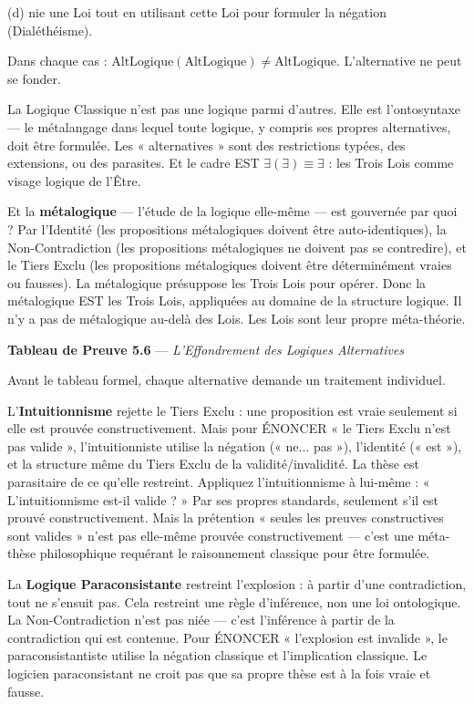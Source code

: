 \documentclass[10pt, openany, oneside]{book}
\begin{document}
(d) nie une Loi tout en utilisant cette Loi pour formuler la négation (Dialéthéisme).

Dans chaque cas : $\text{AltLogique}(\text{AltLogique}) \neq \text{AltLogique}$. L'alternative ne peut se fonder.

La Logique Classique n'est pas une logique parmi d'autres. Elle est l'ontosyntaxe --- le métalangage dans lequel toute logique, y compris ses propres alternatives, doit être formulée. Les « alternatives » sont des restrictions typées, des extensions, ou des parasites. Et le cadre EST $\exists(\exists) \equiv \exists$ : les Trois Lois comme visage logique de l'Être.

Et la \textbf{métalogique} --- l'étude de la logique elle-même --- est gouvernée par quoi ? Par l'Identité (les propositions métalogiques doivent être auto-identiques), la Non-Contradiction (les propositions métalogiques ne doivent pas se contredire), et le Tiers Exclu (les propositions métalogiques doivent être déterminément vraies ou fausses). La métalogique présuppose les Trois Lois pour opérer. Donc la métalogique EST les Trois Lois, appliquées au domaine de la structure logique. Il n'y a pas de métalogique au-delà des Lois. Les Lois sont leur propre méta-théorie.



\textbf{Tableau de Preuve 5.6} --- \textit{L'Effondrement des Logiques Alternatives}

\noindent Avant le tableau formel, chaque alternative demande un traitement individuel.

L'\textbf{Intuitionnisme} rejette le Tiers Exclu : une proposition est vraie seulement si elle est prouvée constructivement. Mais pour ÉNONCER « le Tiers Exclu n'est pas valide », l'intuitionniste utilise la négation (« ne... pas »), l'identité (« est »), et la structure même du Tiers Exclu de la validité/invalidité. La thèse est parasitaire de ce qu'elle restreint. Appliquez l'intuitionnisme à lui-même : « L'intuitionnisme est-il valide ? » Par ses propres standards, seulement s'il est prouvé constructivement. Mais la prétention « seules les preuves constructives sont valides » n'est pas elle-même prouvée constructivement --- c'est une méta-thèse philosophique requérant le raisonnement classique pour être formulée.

La \textbf{Logique Paraconsistante} restreint l'explosion : à partir d'une contradiction, tout ne s'ensuit pas. Cela restreint une règle d'inférence, non une loi ontologique. La Non-Contradiction n'est pas niée --- c'est l'inférence à partir de la contradiction qui est contenue. Pour ÉNONCER « l'explosion est invalide », le paraconsistantiste utilise la négation classique et l'implication classique. Le logicien paraconsistant ne croit pas que sa propre thèse est à la fois vraie et fausse.
\end{document}
